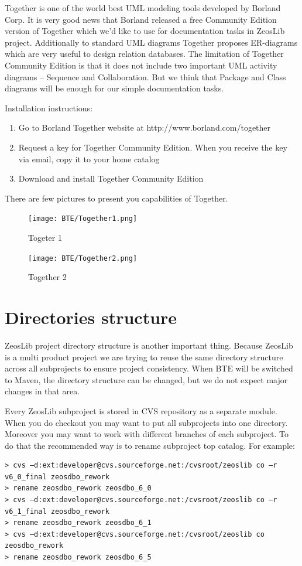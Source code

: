 \documentclass[a4paper,12pt,oneside]{book}
\begin{document}
Together is one of the world best UML modeling tools developed by Borland Corp.
It is very good news that Borland released a free Community Edition version of Together which we’d like to use for documentation tasks in ZeosLib project.
Additionally to standard UML diagrams Together proposes ER-diagrams which are very useful to design relation databases.
The limitation of Together Community Edition is that it does not include two important UML activity diagrams – Sequence and Collaboration.
But we think that Package and Class diagrams will be enough for our simple documentation tasks.

Installation instructions:
\begin{enumerate}
  \item Go to Borland Together website at http://www.borland.com/together
	\item Request a key for Together Community Edition. When you receive the key via email, copy it to your home catalog
	\item Download and install Together Community Edition
\end{enumerate}

There are few pictures to present you capabilities of Together.

\begin{figure}[htbp] 
  \centering
  \texttt{[image: BTE/Together1.png]}
  \caption{Togeter 1}
  \label{fig:Together1}
\end{figure}

\begin{figure}[htbp] 
  \centering
  \texttt{[image: BTE/Together2.png]}
  \caption{Together 2}
  \label{fig:Together2}
\end{figure}

\section{Directories structure}
ZeosLib project directory structure is another important thing.
Because ZeosLib is a multi product project we are trying to reuse the same directory structure across all subprojects to ensure project consistency.
When BTE will be switched to Maven, the directory structure can be changed, but we do not expect major changes in that area.

Every ZeosLib subproject is stored in CVS repository as a separate module.
When you do checkout you may want to put all subprojects into one directory.
Moreover you may want to work with different branches of each subproject.
To do that the recommended way is to rename subproject top catalog.
For example:
\begin{verbatim}
> cvs –d:ext:developer@cvs.sourceforge.net:/cvsroot/zeoslib co –r v6_0_final zeosdbo_rework
> rename zeosdbo_rework zeosdbo_6_0
> cvs –d:ext:developer@cvs.sourceforge.net:/cvsroot/zeoslib co –r v6_1_final zeosdbo_rework
> rename zeosdbo_rework zeosdbo_6_1
> cvs –d:ext:developer@cvs.sourceforge.net:/cvsroot/zeoslib co zeosdbo_rework
> rename zeosdbo_rework zeosdbo_6_5
\end{verbatim}
\end{document}
